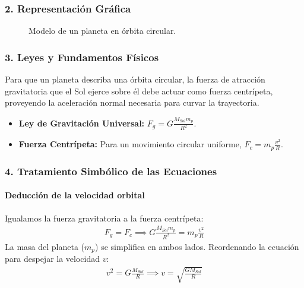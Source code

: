 \subsubsection*{2. Representación Gráfica}
\begin{figure}[H]
    \centering
    \caption{Modelo de un planeta en órbita circular.}
\end{figure}

\subsubsection*{3. Leyes y Fundamentos Físicos}
Para que un planeta describa una órbita circular, la fuerza de atracción gravitatoria que el Sol ejerce sobre él debe actuar como fuerza centrípeta, proveyendo la aceleración normal necesaria para curvar la trayectoria.
\begin{itemize}
    \item \textbf{Ley de Gravitación Universal:} $F_g = G \frac{M_{Sol} m_p}{R^2}$.
    \item \textbf{Fuerza Centrípeta:} Para un movimiento circular uniforme, $F_c = m_p \frac{v^2}{R}$.
\end{itemize}

\subsubsection*{4. Tratamiento Simbólico de las Ecuaciones}
\paragraph*{Deducción de la velocidad orbital}
Igualamos la fuerza gravitatoria a la fuerza centrípeta:
\begin{gather}
    F_g = F_c \implies G \frac{M_{Sol} m_p}{R^2} = m_p \frac{v^2}{R}
\end{gather}
La masa del planeta ($m_p$) se simplifica en ambos lados. Reordenando la ecuación para despejar la velocidad $v$:
\begin{gather}
    v^2 = G \frac{M_{Sol}}{R} \implies v = \sqrt{\frac{G M_{Sol}}{R}}
\end{gather}


